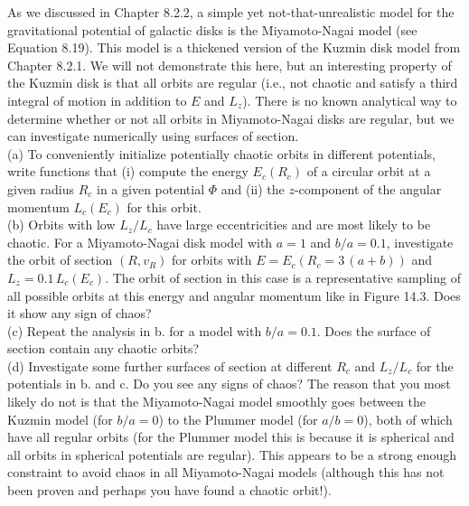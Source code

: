 \documentclass[12pt]{article}
\begin{document}
As we discussed in Chapter 8.2.2, a simple yet not-that-unrealistic model for the 
gravitational potential of galactic disks is the Miyamoto-Nagai model (see Equation 8.19). 
This model is a thickened version of the Kuzmin disk model from Chapter 8.2.1. We will 
not demonstrate this here, but an interesting property of the Kuzmin disk is that all
orbits are regular (i.e., not chaotic and satisfy a third integral of motion in addition 
to $E$ and $L_z$). There is no known analytical way to determine whether or not all 
orbits in Miyamoto-Nagai disks are regular, but we can investigate numerically using 
surfaces of section.\\

(a) To conveniently initialize potentially chaotic orbits in different potentials, write 
functions that (i) compute the energy \(E_c(R_c)\) of a circular orbit at a given radius 
\(R_c\) in a given potential \(\Phi\) and (ii) the \(z\)-component of the angular momentum 
\(L_c(E_c)\) for this orbit.\\

(b) Orbits with low \(L_z/L_c\) have large eccentricities and are most likely to be 
chaotic. For a Miyamoto-Nagai disk model with \(a=1\) and \(b/a = 0.1\), investigate 
the orbit of section $(R,v_R)$ for orbits with \(E = E_c(R_c = 3\,(a+b))\) and 
\(L_z = 0.1\,L_c(E_c)\). The orbit of section in this case is a representative sampling 
of all possible orbits at this energy and angular momentum like in Figure 14.3. Does it 
show any sign of chaos?\\

(c) Repeat the analysis in b. for a model with \(b/a = 0.1\). Does the surface of section 
contain any chaotic orbits?\\

(d) Investigate some further surfaces of section at different \(R_c\) and \(L_z/L_c\) for 
the potentials in b. and c. Do you see any signs of chaos? The reason that you most likely 
do not is that the Miyamoto-Nagai model smoothly goes between the Kuzmin 
model (for \(b/a=0\)) to the Plummer model (for \(a/b=0\)), both of which have all 
regular orbits (for the Plummer model this is because it is spherical and all orbits in 
spherical potentials are regular). This appears to be a strong enough constraint to 
avoid chaos in all Miyamoto-Nagai models (although this has not been 
proven and perhaps you have found a chaotic orbit!).
\end{document}
